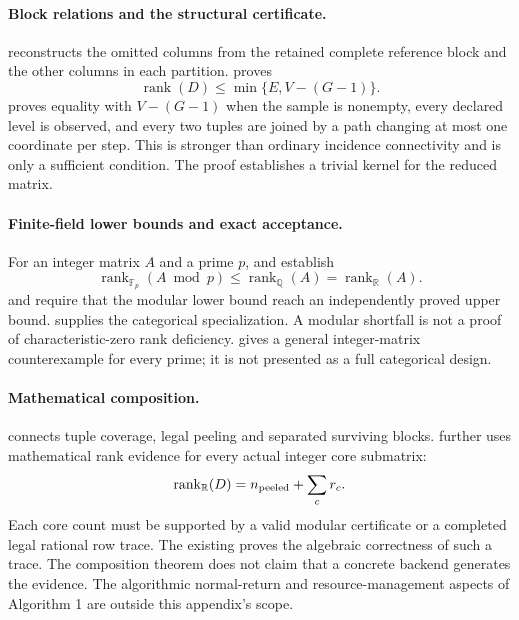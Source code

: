 \paragraph{Block relations and the structural certificate.}
 reconstructs the omitted columns from the
retained complete reference block and the other columns in each partition.
 proves
\[
 \operatorname{rank}(D)\leq\min\{E,V-(G-1)\}.
\]
 proves equality with $V-(G-1)$ when the
sample is nonempty, every declared level is observed, and every two tuples
are joined by a path changing at most one coordinate per step. This is
stronger than ordinary incidence connectivity and is only a sufficient
condition. The proof establishes a trivial kernel for the reduced matrix.

\paragraph{Finite-field lower bounds and exact acceptance.}
For an integer matrix $A$ and a prime $p$,
 and
 establish
\[
 \operatorname{rank}_{\mathbb F_p}(A\bmod p)
 \leq\operatorname{rank}_{\mathbb Q}(A)
 =\operatorname{rank}_{\mathbb R}(A).
\]
 and  require
that the modular lower bound reach an independently proved upper bound.
 supplies the categorical specialization.
A modular shortfall is not a proof of characteristic-zero rank deficiency.
 gives a general integer-matrix
counterexample for every prime; it is not presented as a full categorical design.

\paragraph{Mathematical composition.}
 connects tuple coverage, legal peeling
and separated surviving blocks.  further
uses mathematical rank evidence for every actual integer core submatrix:
\[
 \operatorname{rank}_{\mathbb R}(D)
 = n_{\rm peeled}+\sum_c r_c.
\]
Each core count must be supported by a valid modular certificate or a completed
legal rational row trace. The existing  proves the
algebraic correctness of such a trace. The composition theorem does not claim
that a concrete backend generates the evidence. The algorithmic normal-return
and resource-management aspects of Algorithm 1 are outside this appendix's scope.

